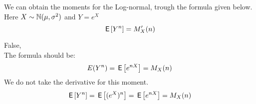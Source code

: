 \documentclass[tf-tutorial-all.tex]{subfiles}
\begin{document}
\begin{truefalse}
We can obtain the moments for the Log-normal, trough the formula given below.
Here $X \sim \mathbb{N}(\mu, \sigma^{2})$ and $Y = e^{X}$
$$\,\mathsf{E}\left[Y^{n}\right] =  M_{X}'(n) $$
    \begin{solution}
        False, 
        \\The formula should be:
        $$E(Y^{n}) = \,\mathsf{E}\left[e^{n X}\right] = M_{X}(n) $$
        We do not take the derivative for this moment. 
        $$\,\mathsf{E}\left[Y^{n}\right] = \,\mathsf{E}\left[(e^{X}) ^{n}\right] = \,\mathsf{E}\left[e^{nX}\right] = M_{X}(n)$$
    \end{solution}
\end{truefalse}
\end{document}
